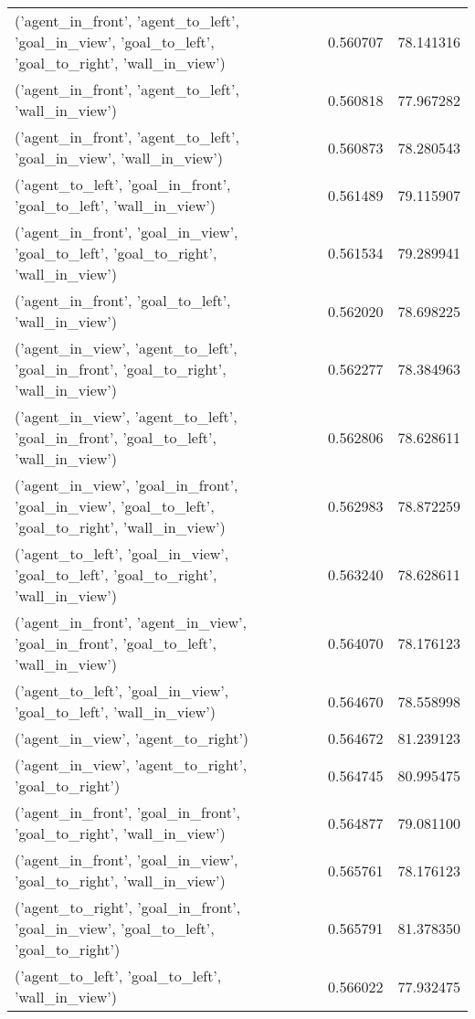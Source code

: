 \begin{tabular}{lrr}
('agent\_in\_front', 'agent\_to\_left', 'goal\_in\_view', 'goal\_to\_left', 'goal\_to\_right', 'wall\_in\_view') & 0.560707 & 78.141316 \\
('agent\_in\_front', 'agent\_to\_left', 'wall\_in\_view') & 0.560818 & 77.967282 \\
('agent\_in\_front', 'agent\_to\_left', 'goal\_in\_view', 'wall\_in\_view') & 0.560873 & 78.280543 \\
('agent\_to\_left', 'goal\_in\_front', 'goal\_to\_left', 'wall\_in\_view') & 0.561489 & 79.115907 \\
('agent\_in\_front', 'goal\_in\_view', 'goal\_to\_left', 'goal\_to\_right', 'wall\_in\_view') & 0.561534 & 79.289941 \\
('agent\_in\_front', 'goal\_to\_left', 'wall\_in\_view') & 0.562020 & 78.698225 \\
('agent\_in\_view', 'agent\_to\_left', 'goal\_in\_front', 'goal\_to\_right', 'wall\_in\_view') & 0.562277 & 78.384963 \\
('agent\_in\_view', 'agent\_to\_left', 'goal\_in\_front', 'goal\_to\_left', 'wall\_in\_view') & 0.562806 & 78.628611 \\
('agent\_in\_view', 'goal\_in\_front', 'goal\_in\_view', 'goal\_to\_left', 'goal\_to\_right', 'wall\_in\_view') & 0.562983 & 78.872259 \\
('agent\_to\_left', 'goal\_in\_view', 'goal\_to\_left', 'goal\_to\_right', 'wall\_in\_view') & 0.563240 & 78.628611 \\
('agent\_in\_front', 'agent\_in\_view', 'goal\_in\_front', 'goal\_to\_left', 'wall\_in\_view') & 0.564070 & 78.176123 \\
('agent\_to\_left', 'goal\_in\_view', 'goal\_to\_left', 'wall\_in\_view') & 0.564670 & 78.558998 \\
('agent\_in\_view', 'agent\_to\_right') & 0.564672 & 81.239123 \\
('agent\_in\_view', 'agent\_to\_right', 'goal\_to\_right') & 0.564745 & 80.995475 \\
('agent\_in\_front', 'goal\_in\_front', 'goal\_to\_right', 'wall\_in\_view') & 0.564877 & 79.081100 \\
('agent\_in\_front', 'goal\_in\_view', 'goal\_to\_right', 'wall\_in\_view') & 0.565761 & 78.176123 \\
('agent\_to\_right', 'goal\_in\_front', 'goal\_in\_view', 'goal\_to\_left', 'goal\_to\_right') & 0.565791 & 81.378350 \\
('agent\_to\_left', 'goal\_to\_left', 'wall\_in\_view') & 0.566022 & 77.932475 \\

\end{tabular}
